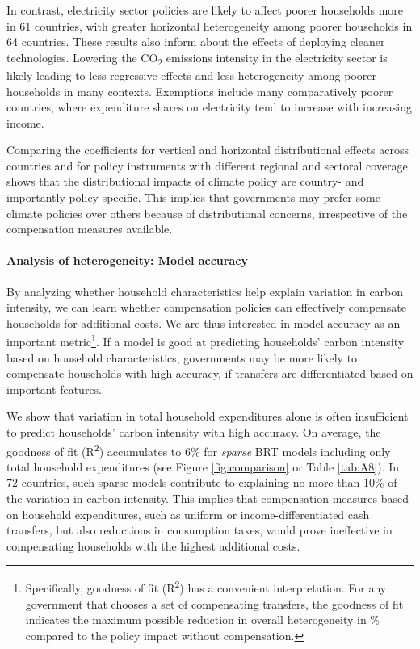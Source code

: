 \documentclass[12pt, a4paper]{article}
\begin{document}
In contrast, electricity sector policies are likely to affect poorer households more in 61 countries, with greater horizontal heterogeneity among poorer households in 64 countries. These results also inform about the effects of deploying cleaner technologies. Lowering the CO\textsubscript{2} emissions intensity in the electricity sector is likely leading to less regressive effects and less heterogeneity among poorer households in many contexts. Exemptions include many comparatively poorer countries, where expenditure shares on electricity tend to increase with increasing income. 

Comparing the coefficients for vertical and horizontal distributional effects across countries and for policy instruments with different regional and sectoral coverage shows that the distributional impacts of climate policy are country- and importantly policy-specific. This implies that governments may prefer some climate policies over others because of distributional concerns, irrespective of the compensation measures available.

\paragraph{Analysis of heterogeneity: Model accuracy} 
By analyzing whether household characteristics help explain variation in carbon intensity, we can learn whether compensation policies can effectively compensate households for additional costs. We are thus interested in model accuracy as an important metric\footnote{Specifically, goodness of fit (R\textsuperscript{2}) has a convenient interpretation. For any government that chooses a set of compensating transfers, the goodness of fit indicates the maximum possible reduction in overall heterogeneity in \% compared to the policy impact without compensation.}. If a model is good at predicting households' carbon intensity based on household characteristics, governments may be more likely to compensate households with high accuracy, if transfers are differentiated based on important features. 

We show that variation in total household expenditures alone is often insufficient to predict households' carbon intensity with high accuracy. On average, the goodness of fit (R\textsuperscript{2}) accumulates to 6\% for \textit{sparse} BRT models including only total household expenditures (see Figure \ref{fig:comparison} or Table \ref{tab:A8}). In 72 countries, such sparse models contribute to explaining no more than 10\% of the variation in carbon intensity. This implies that compensation measures based on household expenditures, such as uniform or income-differentiated cash transfers, but also reductions in consumption taxes, would prove ineffective in compensating households with the highest additional costs.
\end{document}
